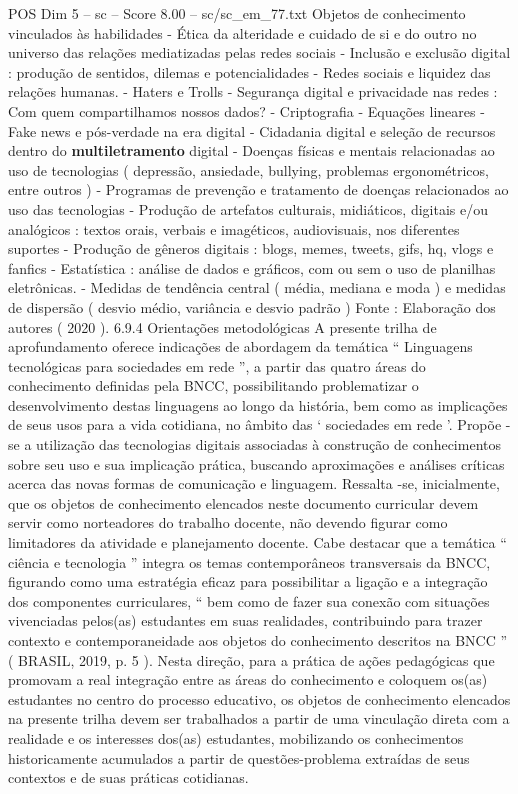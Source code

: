 \begin{textsample}{POS Dim 5 – sc – Score 8.00 – sc/sc\_em\_77.txt}
Objetos de conhecimento vinculados às habilidades - Ética da alteridade e cuidado de si e do outro no universo das relações mediatizadas pelas redes sociais - Inclusão e exclusão digital : produção de sentidos, dilemas e potencialidades - Redes sociais e liquidez das relações humanas. - Haters e Trolls - Segurança digital e privacidade nas redes : Com quem compartilhamos nossos dados? - Criptografia - Equações lineares - Fake news e pós-verdade na era digital - Cidadania digital e seleção de recursos dentro do \textbf{multiletramento} digital - Doenças físicas e mentais relacionadas ao uso de tecnologias ( depressão, ansiedade, bullying, problemas ergonométricos, entre outros ) - Programas de prevenção e tratamento de doenças relacionados ao uso das tecnologias - Produção de artefatos culturais, midiáticos, digitais e/ou analógicos : textos orais, verbais e imagéticos, audiovisuais, nos diferentes suportes - Produção de gêneros digitais : blogs, memes, tweets, gifs, hq, vlogs e fanfics - Estatística : análise de dados e gráficos, com ou sem o uso de planilhas eletrônicas. - Medidas de tendência central ( média, mediana e moda ) e medidas de dispersão ( desvio médio, variância e desvio padrão ) Fonte : Elaboração dos autores ( 2020 ). 6.9.4 Orientações metodológicas A presente trilha de aprofundamento oferece indicações de abordagem da temática “ Linguagens tecnológicas para sociedades em rede ”, a partir das quatro áreas do conhecimento definidas pela BNCC, possibilitando problematizar o desenvolvimento destas linguagens ao longo da história, bem como as implicações de seus usos para a vida cotidiana, no âmbito das ‘ sociedades em rede ’.
Propõe -se a utilização das tecnologias digitais associadas à construção de conhecimentos sobre seu uso e sua implicação prática, buscando aproximações e análises críticas acerca das novas formas de comunicação e linguagem.
Ressalta -se, inicialmente, que os objetos de conhecimento elencados neste documento curricular devem servir como norteadores do trabalho docente, não devendo figurar como limitadores da atividade e planejamento docente.
Cabe destacar que a temática “ ciência e tecnologia ” integra os temas contemporâneos transversais da BNCC, figurando como uma estratégia eficaz para possibilitar a ligação e a integração dos componentes curriculares, “ bem como de fazer sua conexão com situações vivenciadas pelos(as) estudantes em suas realidades, contribuindo para trazer contexto e contemporaneidade aos objetos do conhecimento descritos na BNCC ” ( BRASIL, 2019, p. 5 ).
Nesta direção, para a prática de ações pedagógicas que promovam a real integração entre as áreas do conhecimento e coloquem os(as) estudantes no centro do processo educativo, os objetos de conhecimento elencados na presente trilha devem ser trabalhados a partir de uma vinculação direta com a realidade e os interesses dos(as) estudantes, mobilizando os conhecimentos historicamente acumulados a partir de questões-problema extraídas de seus contextos e de suas práticas cotidianas.

\end{textsample}
